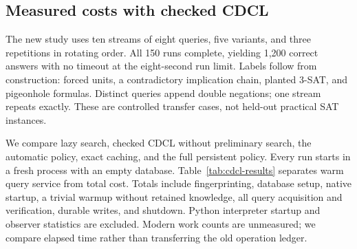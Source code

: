 \documentclass[11pt,a4paper]{article}
\numberwithin{equation}{section}
\theoremstyle{plain}
\theoremstyle{definition}
\theoremstyle{remark}
\begin{document}
\subsection{Measured costs with checked CDCL}
\label{sec:cdcl-study}

The new study uses ten streams of eight queries, five variants, and three repetitions in rotating order. All 150 runs complete, yielding 1,200 correct answers with no timeout at the eight-second run limit. Labels follow from construction: forced units, a contradictory implication chain, planted 3-SAT, and pigeonhole formulas. Distinct queries append double negations; one stream repeats exactly. These are controlled transfer cases, not held-out practical SAT instances.

We compare lazy search, checked CDCL without preliminary search, the automatic policy, exact caching, and the full persistent policy. Every run starts in a fresh process with an empty database. Table~\ref{tab:cdcl-results} separates warm query service from total cost. Totals include fingerprinting, database setup, native startup, a trivial warmup without retained knowledge, all query acquisition and verification, durable writes, and shutdown. Python interpreter startup and observer statistics are excluded. Modern work counts are unmeasured; we compare elapsed time rather than transferring the old operation ledger.
\end{document}
